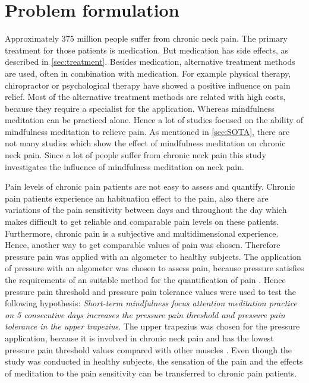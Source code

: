 \chapter{Problem formulation}

Approximately 375 million people suffer from chronic neck pain. The primary treatment for those patients is medication. But medication has side effects, as described in \ref{sec:treatment}.  Besides medication, alternative treatment methods are used, often in combination with medication. For example physical therapy, chiropractor or psychological therapy have showed a positive influence on pain relief. Most of the alternative treatment methods are related with high costs, because they require a specialist for the application. Whereas mindfulness meditation can be practiced alone. Hence a lot of studies focused on the ability of mindfulness meditation to relieve pain.
As mentioned in \ref{sec:SOTA}, there are not many studies which show the effect of mindfulness meditation on chronic neck pain. Since a lot of people suffer from chronic neck pain this study investigates the influence of mindfulness meditation on neck pain. 


Pain levels of chronic pain patients are not easy to assess and quantify. Chronic pain patients experience an habituation effect to the pain, also there are variations of the pain sensitivity between days and throughout the day which makes difficult to get reliable and comparable pain levels on these patients. Furthermore, chronic pain is a subjective and multidimensional experience.
Hence, another way to get comparable values of pain was chosen. Therefore pressure pain was applied with an algometer to healthy subjects. The application of pressure with an algometer was chosen to assess pain, because pressure satisfies the requirements of an suitable method for the quantification of pain \cite{Keele1954}. Hence pressure pain threshold and pressure pain tolerance values were used to test the following hypothesis:
\textit{Short-term mindfulness focus attention meditation practice on 5 consecutive days increases the pressure pain threshold and pressure pain tolerance in the upper trapezius}. The upper trapezius was chosen for the pressure application, because it is involved in chronic neck pain and has the lowest pressure pain threshold values compared with other muscles \cite{Falla2004,Fischer1987}. Even though the study was conducted in healthy subjects, the sensation of the pain and the effects of meditation to the pain sensitivity can be transferred to chronic pain patients.


